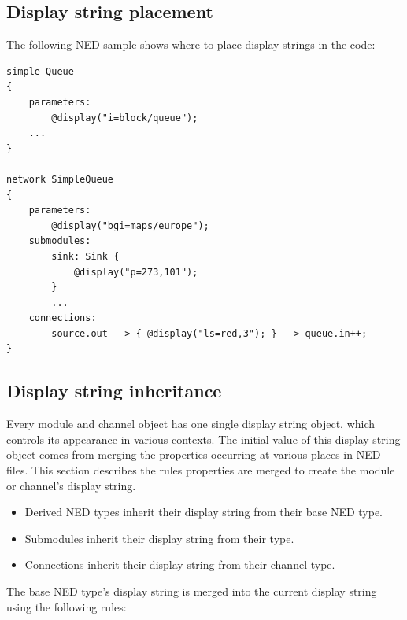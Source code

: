 \subsection{Display string placement}

The following NED sample shows where to place display strings in the code:

\begin{verbatim}
simple Queue
{
    parameters:
        @display("i=block/queue"); 
    ...
}

network SimpleQueue
{
    parameters:
        @display("bgi=maps/europe");
    submodules:
        sink: Sink {
            @display("p=273,101");
        }
        ...
    connections:
        source.out --> { @display("ls=red,3"); } --> queue.in++;
}
\end{verbatim}

\subsection{Display string inheritance}

Every module and channel object has one single display string object,
which controls its appearance in various contexts. The initial value of
this display string object comes from merging the 
properties occurring at various places in NED files.
This section describes the rules  properties are merged
to create the module or channel's display string.

\begin{itemize}
  \item Derived NED types inherit their display string from their base NED type.
  \item Submodules inherit their display string from their type.
  \item Connections inherit their display string from their channel type.
\end{itemize}

The base NED type's display string is merged into the current display string
using the following rules:

